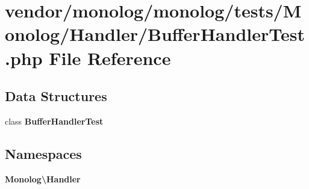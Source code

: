 \section{vendor/monolog/monolog/tests/\+Monolog/\+Handler/\+Buffer\+Handler\+Test.php File Reference}
\label{_buffer_handler_test_8php}
\subsection*{Data Structures}
\begin{DoxyCompactItemize}
\item 
class {\bf Buffer\+Handler\+Test}
\end{DoxyCompactItemize}
\subsection*{Namespaces}
\begin{DoxyCompactItemize}
\item 
 {\bf Monolog\textbackslash{}\+Handler}
\end{DoxyCompactItemize}
